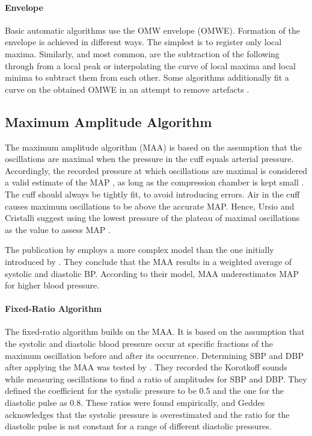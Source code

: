 \paragraph{Envelope} 
Basic automatic algorithms use the OMW envelope (OMWE). Formation of the envelope is achieved in different ways. The simplest is to register only local maxima. Similarly, and most common, are the subtraction of the following through from a local peak or interpolating the curve of local maxima and local minima to subtract them from each other. Some algorithms additionally fit a curve on the obtained OMWE in an attempt to remove artefacts \citep{Forouzanfar2014}.


\subsection{Maximum Amplitude Algorithm}\label{sec:MAA}
The maximum amplitude algorithm (MAA) is based on the assumption that the oscillations are maximal when the pressure in the cuff equals arterial pressure. Accordingly, the recorded pressure at which oscillations are maximal is considered a valid estimate of the MAP \citep{Babbs2012, Geddes1982, Drzewiecki1994, Ramsey1979}, as long as the compression chamber is kept small \citep{Mauck1980}. The cuff should always be tightly fit, to avoid introducing errors. Air in the cuff causes maximum oscillations to be above the accurate MAP. Hence, Ursio and Cristalli suggest using the lowest pressure of the plateau of maximal oscillations as the value to assess MAP \citep{Ursino1996}.

The publication by \citet{Chandrasekhar2019} employs a more complex model than the one initially introduced by \citet{Mauck1980}. They conclude that the MAA results in a weighted average of systolic and diastolic BP. According to their model, MAA underestimates MAP for higher blood pressure.

\paragraph{Fixed-Ratio Algorithm} The fixed-ratio algorithm builds on the MAA. It is based on the assumption that the systolic and diastolic blood pressure occur at specific fractions of the maximum oscillation before and after its occurrence. Determining SBP and DBP after applying the MAA was tested by \citet{Geddes1982}. They recorded the Korotkoff sounds while measuring oscillations to find a ratio of amplitudes for SBP and DBP. They defined the coefficient for the systolic pressure to be 0.5 and the one for the diastolic pulse as 0.8. These ratios were found empirically, and Geddes acknowledges that the systolic pressure is overestimated and the ratio for the diastolic pulse is not constant for a range of different diastolic pressures.

